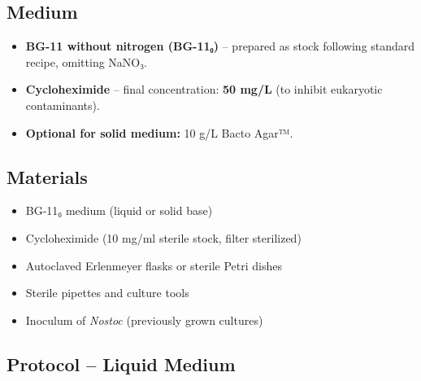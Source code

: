 \documentclass[
  11pt,
]{article}
\providecommand{\tightlist}{%
  \setlength{\itemsep}{0pt}\setlength{\parskip}{0pt}}
\begin{document}
\subsection{Medium}\label{medium}

\begin{itemize}
\tightlist
\item
  \textbf{BG-11 without nitrogen (BG-11₀)} -- prepared as stock
  following standard recipe, omitting NaNO₃.\\
\item
  \textbf{Cycloheximide} -- final concentration: \textbf{50 mg/L} (to
  inhibit eukaryotic contaminants).\\
\item
  \textbf{Optional for solid medium:} 10 g/L Bacto Agar™.
\end{itemize}

\subsection{Materials}\label{materials}

\begin{itemize}
\tightlist
\item
  BG-11₀ medium (liquid or solid base)\\
\item
  Cycloheximide (10 mg/ml sterile stock, filter sterilized)\\
\item
  Autoclaved Erlenmeyer flasks or sterile Petri dishes\\
\item
  Sterile pipettes and culture tools\\
\item
  Inoculum of \emph{Nostoc} (previously grown cultures)
\end{itemize}

\subsection{Protocol -- Liquid Medium}\label{protocol-liquid-medium}
\end{document}
